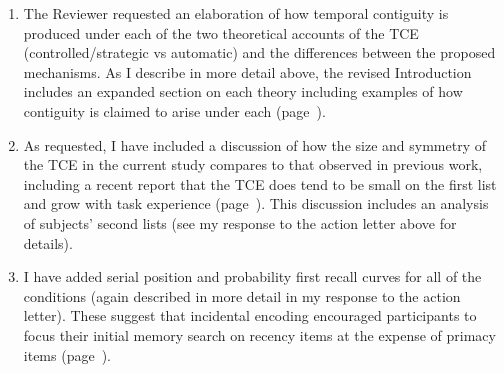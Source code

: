 \documentclass[12pt]{article}
\begin{document}
\begin{enumerate}

\item 
	The Reviewer requested an elaboration of how temporal contiguity is produced under each of the two theoretical accounts of the TCE (controlled/strategic vs automatic) and the differences between the proposed mechanisms. As I describe in more detail above, the revised Introduction includes an expanded section on each theory including examples of how contiguity is claimed to arise under each (page~\pageref{TODO-2}).

\item
	As requested, I have included a discussion of how the size and symmetry of the TCE in the current study compares to that observed in previous work, including a recent report that the TCE does tend to be small on the first list and grow with task experience (page~\pageref{TODO-5}). This discussion includes an analysis of subjects' second lists (see my response to the action letter above for details).
	
\item
	I have added serial position and probability first recall curves for all of the conditions (again described in more detail in my response to the action letter). These suggest that incidental encoding encouraged participants to focus their initial memory search on recency items at the expense of primacy items (page~\pageref{SPCtalk}).

\end{enumerate}
\end{document}
